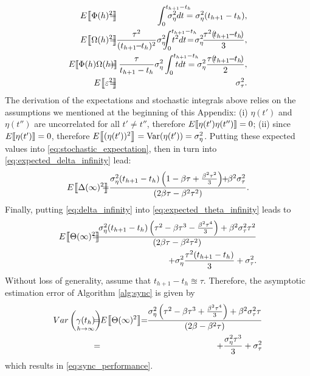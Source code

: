 \begin{eqnarray}
\expected{\Phi(h)^2}\!\!\!\!\!\!\! 
& = & \!\!\!\!\!\!
\int_{0}^{t_{h+1}-t_h}\!\!\!\!\!\!\!\!\!\!\!\!\!\!\!\!\!\!\sigma_{\eta}^{2}dt =  \sigma_{\eta}^{2}(t_{h+1}-t_h),\\
\expected{\Omega(h)^2}\!\!\!\!\!\!\! 
& = & \!\!\!\!\!\!
\frac{\tau^2}{(t_{h+1}\!\!-\!\!t_h)^2}
\sigma_{\eta}^{2}\!\!\!\int_{0}^{t_{h+1}-t_h}\!\!\!\!\!\!\!\!\!\!\!\!\!\!\!\!\!\!\!t^2dt\! = \!
\sigma_{\eta}^{2}\!\frac{\tau^2(\!t_{h+1}\!\!-\!\!t_h\!)}{3},\label{eq:stochastic_integral}\\
\expected{\Phi(h)\Omega(h)}\!\!\!\!\!\!\! 
& = & \!\!\!\!\!\!
\frac{\tau}{t_{h+1}-t_h}\sigma_{\eta}^{2}\int_{0}^{t_{h+1}-t_h}\!\!\!\!\!\!\!\!\!\!\!\!\!\!\!\!\!\!tdt = 
\sigma_{\eta}^{2}\frac{\tau(\!t_{h+1}\!\!-\!\!t_h\!)}{2}, \\
\expected{\varepsilon^2}\!\!\!\!\!\!\! 
& = & \!\!\!\!\!\! 
\sigma_{\tau}^{2}.
\end{eqnarray}	
The derivation of the expectations and stochastic integrals above relies on the 
assumptions we mentioned 
at the beginning of this Appendix: (i) $\eta(t')$ and $\eta(t'')$ are 
uncorrelated for all $t'\neq t''$, therefore $E\!\left\llbracket \eta(t')\eta(t'') \right\rrbracket=0$; 
(ii) since $E\!\left\llbracket \eta(t') \right\rrbracket=0$, therefore 
$E\!\left\llbracket (\eta(t'))^2 \right\rrbracket=\mathrm{Var}(\eta(t'))=\sigma_{\eta}^2$. Putting these 
expected 
values into \eqref{eq:stochastic_expectation}, then in 
turn into \eqref{eq:expected_delta_infinity} lead:
\begin{eqnarray}
\expected{\Delta(\infty)^2}\!\!\!\!\!\!
& = &\!\!\!\!\!\!
\frac{\sigma^2_{\eta}(t_{h+1}-t_h)\left(1-\beta\tau+\frac{\beta^2\tau^2}{3}\right)\!\!+\!\!\beta^2\sigma^2_{\tau}}{(2\beta\tau-\beta^2\tau^2)}.
\label{eq:delta_infinity}
\end{eqnarray}
Finally, putting \eqref{eq:delta_infinity} into 
\eqref{eq:expected_theta_infinity} 
leads to
\begin{eqnarray}
\expected{\Theta(\infty)^2}\!\!\!\!\!\!\! & = & \!\!\!\!\!\!\!
\frac{\sigma^2_{\eta}(t_{h+1}-t_h)\left(\tau^2
	-\beta\tau^3-\frac{\beta^2\tau^4}{3}\right)
	+\beta^2\sigma^2_{\tau}\tau^2}{(2\beta\tau-\beta^2\tau^2)} \nonumber \\ 
\!\!\!\!\!\!\! &  & \!\!\!\!\!\!\!+ 
\sigma^2_{\eta}\frac{\tau^2(t_{h+1}-t_h)}{3}+\sigma^2_{\tau}.
\end{eqnarray}
Without loss of generality, assume that $t_{h+1}-t_h\approxeq\tau$. Therefore, 
the asymptotic estimation error of Algorithm \ref{alg:sync} is given by
\begin{eqnarray}
Var\left(\underset{h\rightarrow\infty}{\gamma(t_h)}\right)\!\!\!\!\!\!\!& = &\!\!\!\!\!\! 
\expected{\Theta(\infty)^2}\!\! = \!\!
\frac{\sigma^2_{\eta}\left(\tau^2-\beta\tau^3
	+\frac{\beta^2\tau^4}{3}\right)
	+\beta^2\sigma^2_{\tau}\tau}{(2\beta-\beta^2\tau)} \nonumber \\
\!\!\!\!\!\!\!& = &\!\!\!\!\!\!  +\frac{\sigma^2_{\eta}\tau^3}{3}
+  \sigma^2_{\tau}
\end{eqnarray}
which results in \eqref{eq:sync_performance}.

